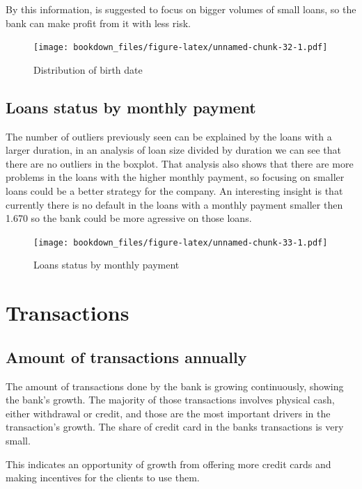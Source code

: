 \documentclass[]{book}
\begin{document}
By this information, is suggested to focus on bigger volumes of small
loans, so the bank can make profit from it with less risk.

\begin{figure}
\centering
\texttt{[image: bookdown\_files/figure-latex/unnamed-chunk-32-1.pdf]}
\caption{\label{fig:unnamed-chunk-32}Distribution of birth date}
\end{figure}

\section{Loans status by monthly
payment}\label{loans-status-by-monthly-payment}

The number of outliers previously seen can be explained by the loans
with a larger duration, in an analysis of loan size divided by duration
we can see that there are no outliers in the boxplot. That analysis also
shows that there are more problems in the loans with the higher monthly
payment, so focusing on smaller loans could be a better strategy for the
company. An interesting insight is that currently there is no default in
the loans with a monthly payment smaller then 1.670 so the bank could be
more agressive on those loans.

\begin{figure}
\centering
\texttt{[image: bookdown\_files/figure-latex/unnamed-chunk-33-1.pdf]}
\caption{\label{fig:unnamed-chunk-33}Loans status by monthly payment}
\end{figure}

\chapter{Transactions}\label{transactions-1}

\section{Amount of transactions
annually}\label{amount-of-transactions-annually}

The amount of transactions done by the bank is growing continuously,
showing the bank's growth. The majority of those transactions involves
physical cash, either withdrawal or credit, and those are the most
important drivers in the transaction's growth. The share of credit card
in the banks transactions is very small.

This indicates an opportunity of growth from offering more credit cards
and making incentives for the clients to use them.
\end{document}
